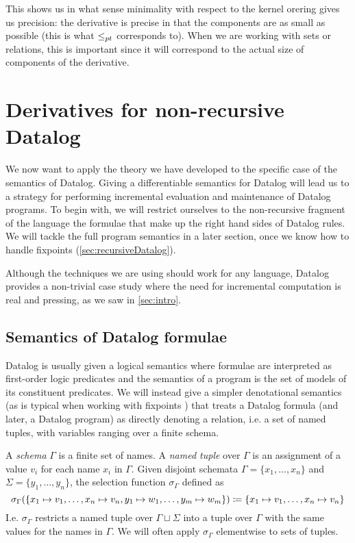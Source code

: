 This shows us in what sense minimality with respect to the kernel orering gives
us precision: the derivative is precise in that the components are as small as
possible (this is what $\leq_{pt}$ corresponds to). When we are working with sets or relations, this is important since it
will correspond to the actual size of components of the derivative.

\section{Derivatives for non-recursive Datalog}
\label{sec:nonRecursiveDatalog}

We now want to apply the theory we have developed to the specific case of the semantics
of Datalog. Giving a differentiable semantics for Datalog will
lead us to a strategy for performing incremental evaluation and maintenance of Datalog programs. 
To begin with, we will restrict ourselves to the non-recursive fragment of the
language \textemdash{} the formulae that make up the right hand sides of Datalog
rules. We will tackle the full program semantics in a later section, once we
know how to handle fixpoints (\cref{sec:recursiveDatalog}).

Although the techniques we are using should work for any language, Datalog
provides a non-trivial case study where the need for incremental computation is
real and pressing, as we saw in \cref{sec:intro}.

\subsection{Semantics of Datalog formulae}

Datalog is usually given a logical semantics where formulae are interpreted as first-order
logic predicates and the semantics of a program is the set of models of its constituent
predicates. We will instead give a simpler denotational semantics (as is
typical when working with fixpoints \autocite[See e.g.][]{compton1994stratified}) that treats a Datalog
formula (and later, a Datalog program) as directly denoting a relation, i.e.
a set of named tuples, with variables ranging over a finite schema.

\begin{defn}
  A \emph{schema} $\Gamma$ is a finite set of names. A \emph{named tuple} over $\Gamma$ is an assignment
  of a value $v_i$ for each name $x_i$ in $\Gamma$. Given disjoint schemata 
  $\Gamma = \{ x_1, \ldots, x_n \}$ and $\Sigma = \{ y_1, \ldots, y_n \}$,
  the selection function $\sigma_\Gamma$ defined as
  \begin{displaymath}
    \sigma_\Gamma(\{x_1 \mapsto v_1, \ldots, x_n \mapsto v_n, y_1 \mapsto w_1, \ldots, y_m \mapsto w_m \})
    \coloneqq \{ x_1 \mapsto v_1, \ldots, x_n \mapsto v_n \}
  \end{displaymath}
  I.e. $\sigma_\Gamma$ restricts a named tuple over $\Gamma \sqcup \Sigma$ into a tuple over $\Gamma$
  with the same values for the names in $\Gamma$.
  We will often apply $\sigma_\Gamma$ elementwise to sets of tuples.
\end{defn}

